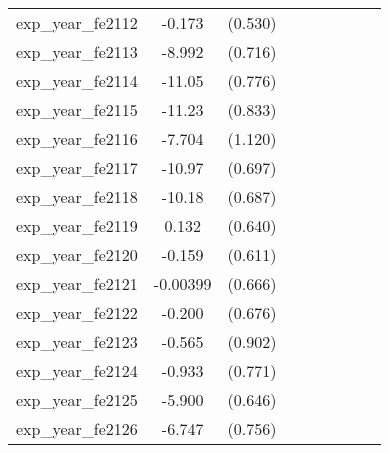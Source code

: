 {\begin{tabular}{l*{4}{cc}}
exp\_year\_fe2112&   -0.173         &  (0.530)&                  &         &                  &         &                  &         \\
exp\_year\_fe2113&   -8.992\sym{***}&  (0.716)&                  &         &                  &         &                  &         \\
exp\_year\_fe2114&   -11.05\sym{***}&  (0.776)&                  &         &                  &         &                  &         \\
exp\_year\_fe2115&   -11.23\sym{***}&  (0.833)&                  &         &                  &         &                  &         \\
exp\_year\_fe2116&   -7.704\sym{***}&  (1.120)&                  &         &                  &         &                  &         \\
exp\_year\_fe2117&   -10.97\sym{***}&  (0.697)&                  &         &                  &         &                  &         \\
exp\_year\_fe2118&   -10.18\sym{***}&  (0.687)&                  &         &                  &         &                  &         \\
exp\_year\_fe2119&    0.132         &  (0.640)&                  &         &                  &         &                  &         \\
exp\_year\_fe2120&   -0.159         &  (0.611)&                  &         &                  &         &                  &         \\
exp\_year\_fe2121& -0.00399         &  (0.666)&                  &         &                  &         &                  &         \\
exp\_year\_fe2122&   -0.200         &  (0.676)&                  &         &                  &         &                  &         \\
exp\_year\_fe2123&   -0.565         &  (0.902)&                  &         &                  &         &                  &         \\
exp\_year\_fe2124&   -0.933         &  (0.771)&                  &         &                  &         &                  &         \\
exp\_year\_fe2125&   -5.900\sym{***}&  (0.646)&                  &         &                  &         &                  &         \\
exp\_year\_fe2126&   -6.747\sym{***}&  (0.756)&                  &         &                  &         &                  &         \\

\end{tabular}}
